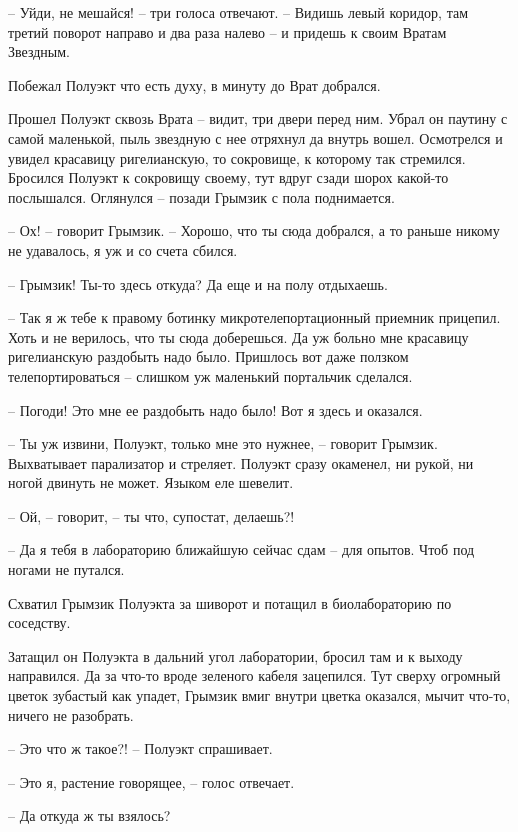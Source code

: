\documentclass[ebook,oneside,final,openright]{memoir}
\begin{document}
– Уйди, не мешайся! – три голоса отвечают. – Видишь левый коридор, там третий поворот направо и два раза налево – и придешь к своим Вратам Звездным.\par
\par
Побежал Полуэкт что есть духу, в минуту до Врат добрался.\par
\par
Прошел Полуэкт сквозь Врата – видит, три двери перед ним. Убрал он паутину с самой маленькой, пыль звездную с нее отряхнул да внутрь вошел. Осмотрелся и увидел красавицу ригелианскую, то сокровище, к которому так стремился. Бросился Полуэкт к сокровищу своему, тут вдруг сзади шорох какой-то послышался. Оглянулся – позади Грымзик с пола поднимается.\par
– Ох! – говорит Грымзик. – Хорошо, что ты сюда добрался, а то раньше никому не удавалось, я уж и со счета сбился.\par
– Грымзик! Ты-то здесь откуда? Да еще и на полу отдыхаешь.\par
– Так я ж тебе к правому ботинку микротелепортационный приемник прицепил. Хоть и не верилось, что ты сюда доберешься. Да уж больно мне красавицу ригелианскую раздобыть надо было. Пришлось вот даже ползком телепортироваться – слишком уж маленький портальчик сделался.\par
– Погоди! Это мне ее раздобыть надо было! Вот я здесь и оказался.\par
– Ты уж извини, Полуэкт, только мне это нужнее, – говорит Грымзик. Выхватывает парализатор и стреляет. Полуэкт сразу окаменел, ни рукой, ни ногой двинуть не может. Языком еле шевелит.\par
– Ой, – говорит, – ты что, супостат, делаешь?!\par
– Да я тебя в лабораторию ближайшую сейчас сдам – для опытов. Чтоб под ногами не путался.\par
Схватил Грымзик Полуэкта за шиворот и потащил в биолабораторию по соседству.\par
\par
Затащил он Полуэкта в дальний угол лаборатории, бросил там и к выходу направился. Да за что-то вроде зеленого кабеля зацепился. Тут сверху огромный цветок зубастый как упадет, Грымзик вмиг внутри цветка оказался, мычит что-то, ничего не разобрать.\par
\par
– Это что ж такое?! – Полуэкт спрашивает.\par
– Это я, растение говорящее, – голос отвечает.\par
– Да откуда ж ты взялось?\par
\end{document}

